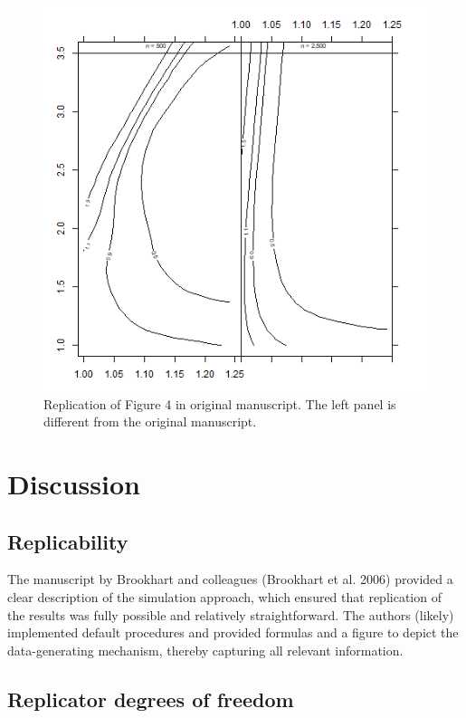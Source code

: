\documentclass[10,a4paperpaper,]{article}
\begin{document}
\begin{figure}
\includegraphics[width=450pt]{../analysis/figures/Figure4} \caption{Replication of Figure 4 in original manuscript. The left panel is different from the original manuscript.}\label{fig:unnamed-chunk-3}
\end{figure}

\FloatBarrier
\section{Discussion}

\subsection{Replicability}

The manuscript by Brookhart and colleagues (Brookhart et al. 2006)
provided a clear description of the simulation approach, which ensured
that replication of the results was fully possible and relatively
straightforward. The authors (likely) implemented default procedures and
provided formulas and a figure to depict the data-generating mechanism,
thereby capturing all relevant information.

\subsection{Replicator degrees of freedom}
\end{document}
